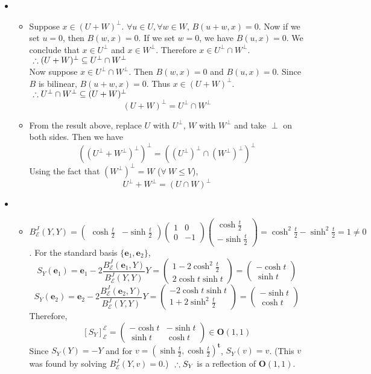 \documentclass[12pt]{report}
\newcommand{\numl}[1]{\item[\large\textbf{\sffamily #1}]}
\newcommand{\num}[1]{\item[\textbf{\sffamily #1}]}
\newcommand{\mc}[1]{\mathcal{#1}}
\newcommand{\rmbf}[1]{\mathrm{\mathbf{#1}}}
\newcommand{\trans}{^{\mathrm{\mathbf{t}}}}
\begin{document}
\begin{itemize}
\numl{13.5.13}
	\begin{itemize}
		\num{(나)} Suppose $x\in (U+W)^\perp$. $\forall u\in U, \forall w\in W$, $B(u + w, x) = 0$. Now if we set $u = 0$, then $B(w, x) = 0$. If we set $w = 0$, we have $B(u, x) = 0$. We conclude that $x\in U^\perp$ and $x\in W^\perp$. Therefore $x\in U^\perp \cap W^\perp$. $~\hfill\therefore (U+W)^\perp \subseteq U^\perp \cap W^\perp$ \\
		Now suppose $x\in U^\perp \cap W^\perp$. Then $B(w, x) = 0$ and $B(u, x) = 0$. Since $B$ is bilinear, $B(u+w, x) = 0$. Thus $x\in (U+W)^\perp$. $~\hfill \therefore U^\perp \cap W^\perp \subseteq (U+W)^\perp$
		$$(U+W)^\perp = U^\perp \cap W^\perp$$
		\num{(다)} From the result above, replace $U$ with $U^\perp$, $W$ with $W^\perp$ and take $\perp$ on both sides. Then we have $$((U^\perp +W^\perp)^\perp)^\perp = ((U^\perp)^\perp \cap (W^\perp)^\perp)^\perp$$ Using the fact that $(W^\perp)^\perp = W$ ($\forall\: W\leq V$), $$U^\perp +W^\perp = (U \cap W)^\perp$$
	\end{itemize}
\numl{13.5.20}
	\begin{itemize}
		\num{(나)} $B^J_\mc{E}(Y, Y) = \begin{pmatrix}
		\cosh\frac{t}{2} & -\sinh\frac{t}{2}
		\end{pmatrix} \begin{pmatrix}
		1 & 0 \\ 0 & -1
		\end{pmatrix} \begin{pmatrix}
		\cosh\frac{t}{2} \\ -\sinh\frac{t}{2}
		\end{pmatrix} = \cosh^2\frac{t}{2} - \sinh^2\frac{t}{2} = 1 \neq 0$. For the standard basis $\{\rmbf{e}_1, \rmbf{e}_2\}$, $$S_Y(\rmbf{e}_1) = \rmbf{e}_1 - 2\frac{B_\mc{E}^J(\rmbf{e}_1, Y)}{B_\mc{E}^J(Y, Y)}Y = \begin{pmatrix}
			1-2\cosh^2\frac{t}{2} \\ 2\cosh{t}\sinh{t}
		\end{pmatrix} = \begin{pmatrix}
		-\cosh{t} \\ \sinh{t}
		\end{pmatrix}$$
		$$S_Y(\rmbf{e}_2) = \rmbf{e}_2 - 2\frac{B_\mc{E}^J(\rmbf{e}_2, Y)}{B_\mc{E}^J(Y, Y)}Y = \begin{pmatrix}
		 -2\cosh{t}\sinh{t} \\ 1+2\sinh^2\frac{t}{2}
		\end{pmatrix} = \begin{pmatrix}
		-\sinh{t} \\ \cosh{t}
		\end{pmatrix}$$ Therefore, $$\left[ S_Y \right]^\mc{E}_\mc{E} = \begin{pmatrix}
		-\cosh t & -\sinh t \\ \sinh t & \cosh t 
		\end{pmatrix} \in \rmbf{O}(1, 1)$$
		Since $S_Y(Y) = -Y$ and for $v = \left(\sinh\frac{t}{2}, \cosh\frac{t}{2}\right)\trans$, $S_Y(v) = v$. (This $v$ was found by solving $B_\mc{E}^J(Y, v) = 0$.)   $~\hfill \therefore S_Y$ is a reflection of $\rmbf{O}(1, 1)$.
	\end{itemize}


\end{itemize}
\end{document}
